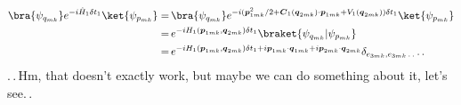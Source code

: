 \documentclass{report}
\begin{document}
\begin{align}
\begin{aligned}
	\bra{\psi_{q_{m k}}} 
		e^{-i  \hat H_{1} \delta t_1 } 
	\ket{\psi_{p_{m k}}}
	=&\,
	\bra{\psi_{q_{m k}}}  
		e^{
			-i
			(
				\boldsymbol p_{1mk}^2 / 2 + 
				\boldsymbol C_{1}(\boldsymbol{q}_{2 m k}) \cdot \boldsymbol p_{1 m k} +
				V_1(\boldsymbol{q}_{2 m k})
			)
			\delta t_1
		} 
	\ket{\psi_{p_{m k}}} 
	\\=&\, 
	e^{
		-i
		H_1(\boldsymbol{p}_{1 m k}, \boldsymbol{q}_{2 m k})
		\delta t_1
	} 
	\braket{\psi_{q_{m k}} | \psi_{p_{m k}}}
	\\=&\, 
	e^{
		-i
		H_1(\boldsymbol{p}_{1 m k}, \boldsymbol{q}_{2 m k})
		\delta t_1 +
		i \boldsymbol{p}_{1 m k} \cdot \boldsymbol{q}_{1 m k} +
		i \boldsymbol{p}_{2 m k} \cdot \boldsymbol{q}_{2 m k}
	} 
	\delta_{e_{3 m k}, e_{3 m k} \,.\,.} \,.\,. 
\end{aligned}
\end{align}
.\,.\,Hm, that doesn't exactly work, but maybe we can do something about it, let's see.\,. %


\end{document}
